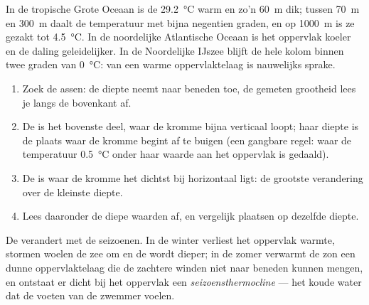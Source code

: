 In de tropische Grote Oceaan is de  \qty{29.2}{\degreeCelsius}
warm en zo'n \qty{60}{m} dik; tussen \qty{70}{m} en \qty{300}{m} daalt de
temperatuur met bijna negentien graden, en op \qty{1000}{m} is ze gezakt tot
\qty{4.5}{\degreeCelsius}. In de noordelijke Atlantische Oceaan is het oppervlak
koeler en de daling geleidelijker. In de Noordelijke IJszee blijft de hele kolom
binnen twee graden van \qty{0}{\degreeCelsius}: van een warme oppervlaktelaag
is nauwelijks sprake.

\begin{method}\label{met:g10:layered-ocean:profile}
\begin{enumerate}
  \item Zoek de assen: de diepte neemt naar beneden toe, de gemeten grootheid
        lees je langs de bovenkant af.
  \item De  is het bovenste deel, waar de kromme bijna verticaal
        loopt; haar diepte is de plaats waar de kromme begint af te buigen (een
        gangbare regel: waar de temperatuur \qty{0.5}{\degreeCelsius} onder haar
        waarde aan het oppervlak is gedaald).
  \item De  is waar de kromme het dichtst bij horizontaal ligt: de
        grootste verandering over de kleinste diepte.
  \item Lees daaronder de diepe waarden af, en vergelijk plaatsen op dezelfde diepte.
\end{enumerate}
\end{method}

De  verandert met de seizoenen. In de winter verliest het oppervlak
warmte, stormen woelen de zee om en de  wordt dieper; in de zomer
verwarmt de zon een dunne oppervlaktelaag die de zachtere winden niet naar
beneden kunnen mengen, en ontstaat er dicht bij het oppervlak een
\emph{seizoensthermocline} --- het koude water dat de voeten van de zwemmer voelen.

